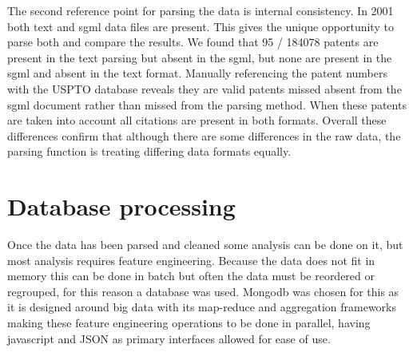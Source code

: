 The second reference point for parsing the data is internal consistency. In 2001 both text and sgml data files are present. This gives the unique opportunity to parse both and compare the results. We found that 95 / 184078 patents are present in the text parsing but absent in the sgml, but none are present in the sgml and absent in the text format. Manually referencing the patent numbers with the USPTO database reveals they are valid patents missed absent from the sgml document rather than missed from the parsing method. When these patents are taken into account all citations are present in both formats. Overall these differences confirm that although there are some differences in the raw data, the parsing function is treating differing data formats equally.



\section{Database processing}

Once the data has been parsed and cleaned some analysis can be done on it, but most analysis requires feature engineering. Because the data does not fit in memory this can be done in batch but often the data must be reordered or regrouped, for this reason a database was used. Mongodb was chosen for this as it is designed around big data with its map-reduce and aggregation frameworks making these feature engineering operations to be done in parallel, having javascript and JSON as primary interfaces allowed for ease of use. 

